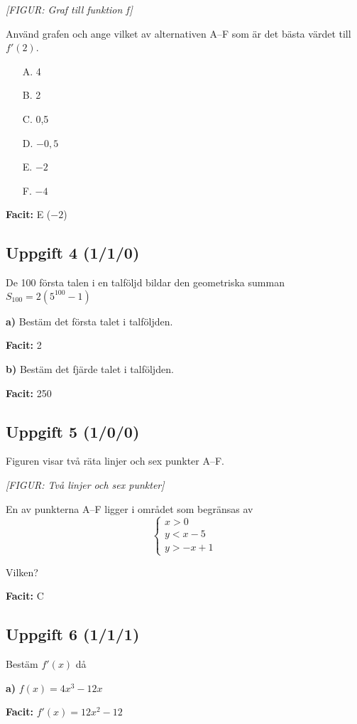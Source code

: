 \documentclass{article}
\begin{document}
\textit{[FIGUR: Graf till funktion f]}

Använd grafen och ange vilket av alternativen A--F som är det bästa värdet till $f'(2)$.

\begin{itemize}
    \item[A.] 4
    \item[B.] 2
    \item[C.] 0,5
    \item[D.] $-0,5$
    \item[E.] $-2$
    \item[F.] $-4$
\end{itemize}

\textbf{Facit:} E ($-2$)

\subsection*{Uppgift 4 (1/1/0)}
De 100 första talen i en talföljd bildar den geometriska summan $S_{100} = 2(5^{100} - 1)$

\textbf{a)} Bestäm det första talet i talföljden.

\textbf{Facit:} 2

\textbf{b)} Bestäm det fjärde talet i talföljden.

\textbf{Facit:} 250

\subsection*{Uppgift 5 (1/0/0)}
Figuren visar två räta linjer och sex punkter A--F.

\textit{[FIGUR: Två linjer och sex punkter]}

En av punkterna A--F ligger i området som begränsas av
\[
\begin{cases}
x > 0 \\
y < x - 5 \\
y > -x + 1
\end{cases}
\]

Vilken?

\textbf{Facit:} C

\subsection*{Uppgift 6 (1/1/1)}
Bestäm $f'(x)$ då

\textbf{a)} $f(x) = 4x^3 - 12x$

\textbf{Facit:} $f'(x) = 12x^2 - 12$
\end{document}
